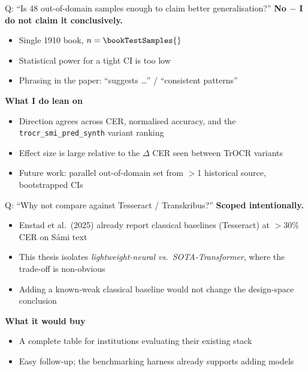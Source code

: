 \begin{frame}{Q: ``Is 48 out-of-domain samples enough to claim better generalisation?''}
  \footnotesize
  \textbf{No $-$ I do not claim it conclusively.}
  \medskip
  \begin{itemize}
    \item Single 1910 book, $n = \bookTestSamples{}$
    \item Statistical power for a tight CI is too low
    \item Phrasing in the paper: ``suggests \dots'' / ``consistent patterns''
  \end{itemize}
  \medskip
  \textbf{What I do lean on}
  \begin{itemize}
    \item Direction agrees across CER, normalised accuracy, and the
      \texttt{trocr\_smi\_pred\_synth} variant ranking
    \item Effect size is large relative to the $\Delta$ CER seen between TrOCR variants
    \item Future work: parallel out-of-domain set from $>$1 historical source,
      bootstrapped CIs
  \end{itemize}
\end{frame}

\begin{frame}{Q: ``Why not compare against Tesseract / Transkribus?''}
  \footnotesize
  \textbf{Scoped intentionally.}
  \medskip
  \begin{itemize}
    \item Enstad et al.\ (2025) already report classical baselines
      (Tesseract) at \alert{$>$30\% CER} on S\'{a}mi text
    \item This thesis isolates \emph{lightweight-neural vs.\ SOTA-Transformer},
      where the trade-off is non-obvious
    \item Adding a known-weak classical baseline would not change the design-space conclusion
  \end{itemize}
  \medskip
  \textbf{What it would buy}
  \begin{itemize}
    \item A complete table for institutions evaluating their existing stack
    \item Easy follow-up; the benchmarking harness already supports adding models
  \end{itemize}
\end{frame}

